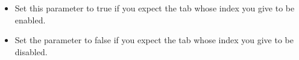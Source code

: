 \begin{itemize}
\item Set this parameter to true if you expect the tab whose index you give to be enabled.
\item Set the parameter to false if you expect the tab whose index you give to be disabled. 
\end{itemize}
    